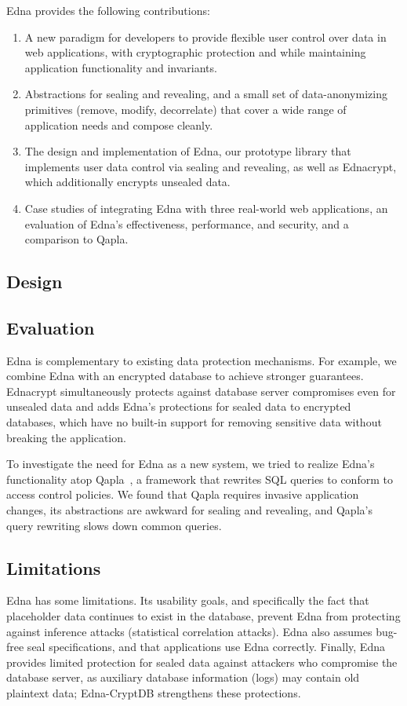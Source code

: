 \label{sec:intro:contrib}
Edna provides the following contributions:
\begin{enumerate}[nosep] 
    \item A new paradigm for developers to provide flexible user control over data in web applications, with cryptographic protection and while maintaining application functionality and invariants.
    \item Abstractions for sealing and revealing, and a small set of data-anonymizing primitives (remove, modify, decorrelate) that cover a wide range of application needs and compose cleanly.
    \item The design and implementation of Edna, our prototype library that implements user data control via sealing and revealing, as well as Ednacrypt, which additionally encrypts unsealed data.
    \item Case studies of integrating Edna with three real-world web applications, an evaluation of Edna's effectiveness, performance, and security, and a comparison to Qapla.
\end{enumerate}

\subsection{Design}

\subsection{Evaluation}
Edna is complementary to existing data protection mechanisms. For example, we
combine Edna with an encrypted database to achieve stronger guarantees.
Ednacrypt simultaneously protects against database server compromises even for
unsealed data and adds Edna's protections for sealed data to encrypted
databases, which have no built-in support for removing sensitive data without
breaking the application.

To investigate the need for Edna as a new system, we tried to realize Edna's
functionality atop Qapla~\cite{qapla}, a framework that rewrites SQL queries to
conform to access control policies. We found that Qapla requires invasive
application changes, its abstractions are awkward for sealing and revealing, and
Qapla's query rewriting slows down common queries.

\subsection{Limitations}
Edna has some limitations. Its usability goals, and specifically the fact that
placeholder data continues to exist in the database, prevent Edna from
protecting against inference attacks (\eg statistical correlation attacks). Edna
also assumes bug-free seal specifications, and that applications use
Edna correctly. Finally, Edna provides limited protection for sealed data
against attackers who compromise the database server, as auxiliary database
information (\eg logs) may contain old plaintext data; Edna-CryptDB strengthens
these protections.

